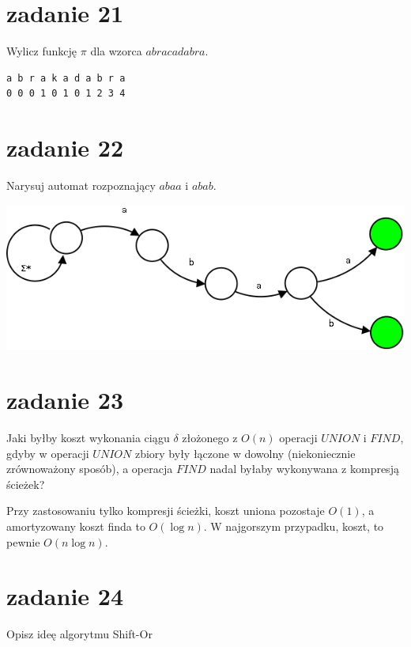 \documentclass[svgnames]{report}
\begin{document}
\section{zadanie 21}
\begin{framed}
Wylicz funkcję $\pi$ dla wzorca $abracadabra$.
\end{framed}
\begin{lstlisting}
a b r a k a d a b r a
0 0 0 1 0 1 0 1 2 3 4
\end{lstlisting}

\section{zadanie 22}
\begin{framed}
Narysuj automat rozpoznający $abaa$ i $abab$.
\end{framed}

\includegraphics[scale=0.55]{images/22.png}
\section{zadanie 23}
\begin{framed}
Jaki byłby koszt wykonania ciągu $\delta$ złożonego z $O(n)$ operacji $UNION$ i $FIND$, gdyby w operacji $UNION$ zbiory były łączone w dowolny (niekoniecznie zrównoważony sposób), a operacja $FIND$ nadal byłaby wykonywana z kompresją ścieżek?
\end{framed}

Przy zastosowaniu tylko kompresji ścieżki, koszt uniona pozostaje $O(1)$, a amortyzowany koszt finda to $O(\log n)$. W najgorszym przypadku, koszt, to pewnie $O(n \log n)$.

\section{zadanie 24}
\begin{framed}
Opisz ideę algorytmu Shift-Or
\end{framed}
\end{document}
